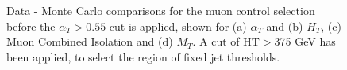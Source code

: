 \begin{figure}[h]
\begin{center}
\newline
{}

\caption{\label{fig:muonplots_beforeat} Data - Monte Carlo comparisons
  for the muon control selection before the $\alpha_{T} > 0.55$ cut is
  applied, shown for (a) $\alpha_{T}$ and (b) $H_{T}$, (c) Muon  Combined Isolation and (d) $M_{T}$.
 A cut of $\mathrm{HT >}$375 GeV has been applied, to select the
 region of fixed jet thresholds.}
\label{fig:kin}
\end{center}
\end{figure}

